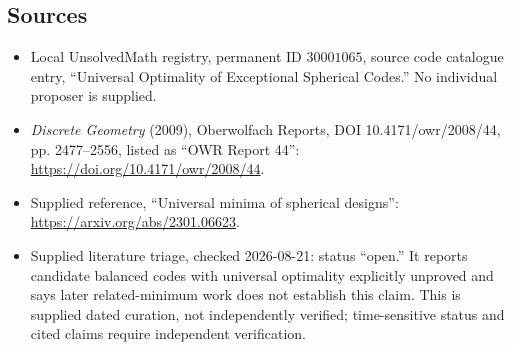 \documentclass[11pt]{article}
\begin{document}
\subsection{Sources}
\begin{itemize}
\item Local UnsolvedMath registry, permanent ID \(30001065\), source code catalogue entry, ``Universal Optimality of Exceptional Spherical Codes.'' No individual proposer is supplied.
\item \emph{Discrete Geometry} (2009), Oberwolfach Reports, DOI 10.4171/owr/2008/44, pp. 2477--2556, listed as ``OWR Report 44'': \url{https://doi.org/10.4171/owr/2008/44}.
\item Supplied reference, ``Universal minima of spherical designs'': \url{https://arxiv.org/abs/2301.06623}.
\item Supplied literature triage, checked 2026-08-21: status ``open.'' It reports candidate balanced codes with universal optimality explicitly unproved and says later related-minimum work does not establish this claim. This is supplied dated curation, not independently verified; time-sensitive status and cited claims require independent verification.
\end{itemize}
\end{document}
